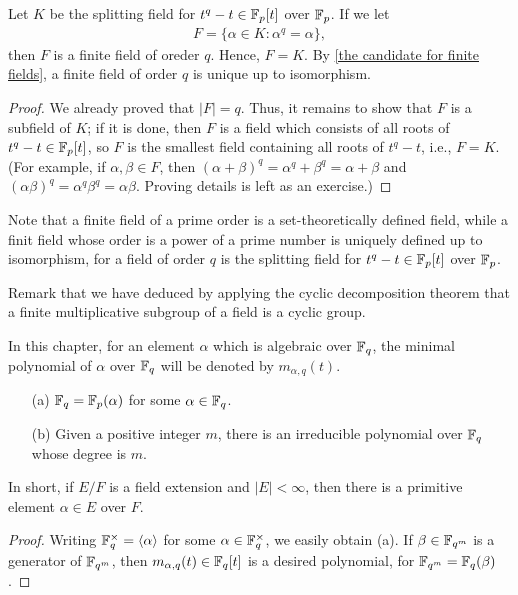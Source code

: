 \begin{thm}
    Let $K$ be the splitting field for $t^q-t\in{\mathbb{F}}_p[t]$ over ${\mathbb{F}}_p$.
    If we let
    \begin{align*}
        F=\{\alpha\in K: \alpha^q=\alpha\},
    \end{align*}
    then $F$ is a finite field of oreder $q$.
    Hence, $F=K$.
    By \cref{the candidate for finite fields}, a finite field of order $q$ is unique up to isomorphism.
\end{thm}
\begin{proof}
    We already proved that $|F|=q$.
    Thus, it remains to show that $F$ is a subfield of $K$; if it is done, then $F$ is a field which consists of all roots of $t^q-t\in{\mathbb{F}}_p[t]$, so $F$ is the smallest field containing all roots of $t^q-t$, i.e., $F=K$.
    (For example, if $\alpha, \beta\in F$, then $(\alpha+\beta)^q=\alpha^q+\beta^q=\alpha+\beta$ and $(\alpha\beta)^q=\alpha^q\beta^q=\alpha\beta$.
    \color{brown}Proving details is left as an exercise.\color{black})
\end{proof}
\begin{rmk}
    Note that a finite field of a prime order is a set-theoretically defined field, while a finit field whose order is a power of a prime number is uniquely defined up to isomorphism, for a field of order $q$ is the splitting field for $t^q-t\in{\mathbb{F}}_p[t]$ over ${\mathbb{F}}_p$.
\end{rmk}

Remark that we have deduced by applying the cyclic decomposition theorem that a finite multiplicative subgroup of a field is a cyclic group.
\begin{nota}
    In this chapter, for an element $\alpha$ which is algebraic over ${\mathbb{F}}_q$, the minimal polynomial of $\alpha$ over ${\mathbb{F}}_q$ will be denoted by $m_{\alpha, q}(t)$.
\end{nota}

\begin{prop}
    \begin{enumerate}
        \item[(a)]
        {
            ${\mathbb{F}}_q={\mathbb{F}}_p(\alpha)$ for some $\alpha\in{\mathbb{F}}_q$.
        }
        \item[(b)]
        {
            Given a positive integer $m$, there is an irreducible polynomial over ${\mathbb{F}}_q$ whose degree is $m$.
        }
    \end{enumerate}
    In short, if $E/F$ is a field extension and $|E|<\infty$, then there is a primitive element $\alpha\in E$ over $F$.
\end{prop}
\begin{proof}
    Writing ${\mathbb{F}}_q^\times={\left\langle{\alpha}\right\rangle}$ for some $\alpha\in{\mathbb{F}}_q^\times$, we easily obtain (a).
    If $\beta\in{\mathbb{F}}_{q^m}$ is a generator of ${\mathbb{F}}_{q^m}$, then $m_{\alpha, q}(t)\in{\mathbb{F}}_q[t]$ is a desired polynomial, for ${\mathbb{F}}_{q^m}={\mathbb{F}}_q(\beta)$.
\end{proof}

